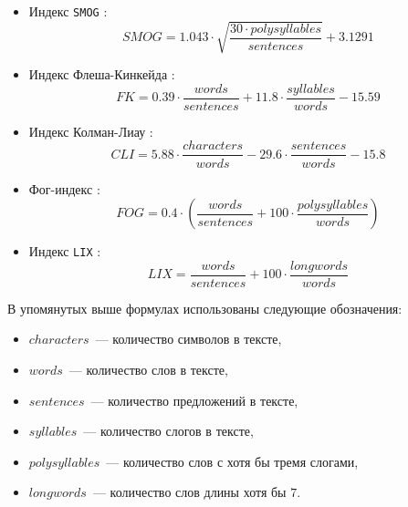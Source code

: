 \documentclass[../diploma.tex]{subfiles}
\begin{document}
\begin{itemize}
   		\item
   		Индекс \texttt{SMOG} \cite{article:smog}: 
   		\begin{equation}
   			SMOG = 1.043 \cdot \sqrt{\frac{30 \cdot polysyllables}{sentences}} + 3.1291
   		\end{equation}

   		\item
   		Индекс Флеша-Кинкейда \cite{article:fk}: 
   		\begin{equation}
   			FK = 0.39 \cdot \frac{words}{sentences} + 11.8 \cdot \frac{syllables}{words} - 15.59
   		\end{equation}
   	
   		\item
   		Индекс Колман-Лиау \cite{article:cli}: 
   		\begin{equation}
   			CLI = 5.88 \cdot \frac{characters}{words} - 29.6 \cdot \frac{sentences}{words} - 15.8
   		\end{equation}
   		
   		\item
   		Фог-индекс \cite{book:fog}: 
   		\begin{equation}
   			FOG = 0.4 \cdot \left( \frac{words}{sentences} + 100 \cdot \frac{polysyllables}{words} \right)
   		\end{equation}

   		\item
   		Индекс \texttt{LIX} \cite{book:lix}: 
   		\begin{equation}
   			LIX = \frac{words}{sentences} + 100 \cdot \frac{longwords}{words}
   		\end{equation}
   	
   	\end{itemize}
    
    В упомянутых выше формулах использованы следующие обозначения:
    
    \begin{itemize}
    	\item
    	$characters$~--- количество символов в тексте,

	    \item
	   	$words$~--- количество слов в тексте,

	    \item
	   	$sentences$~--- количество предложений в тексте,

	    \item
	   	$syllables$~--- количество слогов в тексте,

	    \item
	   	$polysyllables$~--- количество слов с хотя бы тремя слогами,

	    \item
	   	$longwords$~--- количество слов длины хотя бы $7$.
	\end{itemize}
\end{document}

